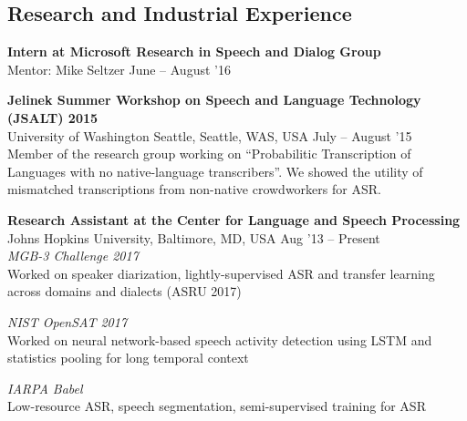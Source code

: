 \documentclass[margin,line,pifont,palatino,courier]{res}
\begin{document}
\begin{resume}
\section{\sc Research and Industrial Experience}


\textbf{Intern at Microsoft Research in Speech and Dialog Group} \\
Mentor: Mike Seltzer \hfill 
June -- August '16 \vspace{2pt}

\textbf{Jelinek Summer Workshop on Speech and Language Technology (JSALT) 2015 } \\
University of Washington Seattle, Seattle, WAS, USA \hfill 
July -- August '15 \vspace{2pt} \\
Member of the research group working on ``Probabilitic Transcription of Languages with no native-language transcribers''. We showed the utility of mismatched transcriptions from non-native crowdworkers for ASR.
\vspace{-5pt}

\textbf{Research Assistant at the Center for Language and Speech Processing} \\
Johns Hopkins University, Baltimore, MD, USA \hfill Aug '13 -- Present \vspace{2pt} \\
\textit{MGB-3 Challenge 2017} \\
Worked on speaker diarization, lightly-supervised ASR and transfer learning across domains and dialects (ASRU 2017)

\textit{NIST OpenSAT 2017} \\
Worked on neural network-based speech activity detection using LSTM and statistics pooling for long temporal context

\textit{IARPA Babel} \\
Low-resource ASR, speech segmentation, semi-supervised training for ASR 


\end{resume}
\end{document}
